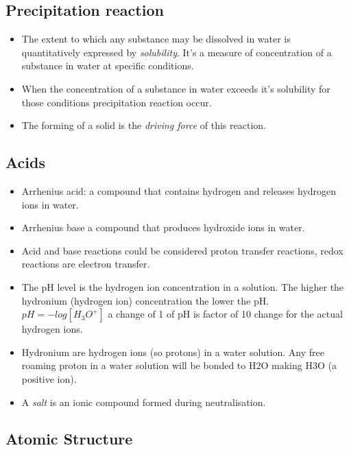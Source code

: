 \documentclass[12pt]{article}
\begin{document}
    \subsection{Precipitation reaction}\label{precipitation-reaction}

        \begin{itemize}
        \item
          The extent to which any substance may be dissolved in water is
          quantitatively expressed by \emph{solubility}. It's a measure of
          concentration of a substance in water at specific conditions.
        \item
          When the concentration of a substance in water exceeds it's solubility
          for those conditions precipitation reaction occur.
        \item
          The forming of a solid is the \emph{driving force} of this reaction.
        \end{itemize}

    \subsection{Acids}\label{acids}

        \begin{itemize}
        \item Arrhenius acid: a compound that contains hydrogen and releases
            hydrogen ions in water. \item
          Arrhenius base a compound that produces hydroxide ions in water.
        \item Acid and base reactions could be considered proton transfer reactions,
          redox reactions are electron transfer.
        \item The pH level is the hydrogen ion concentration in a solution. The
          higher the hydronium (hydrogen ion) concentration the lower the pH.
          \(pH = -log[H_3O^+]\) a change of 1 of pH is factor of 10 change for
          the actual hydrogen ions.
        \item Hydronium are hydrogen ions (so protons) in a water solution. Any free
          roaming proton in a water solution will be bonded to H2O making H3O (a
          positive ion).
        \item A \emph{salt} is an ionic compound formed during neutralisation.
        \end{itemize}

\subsection{Atomic Structure}\label{atomic-structure}
\end{document}
